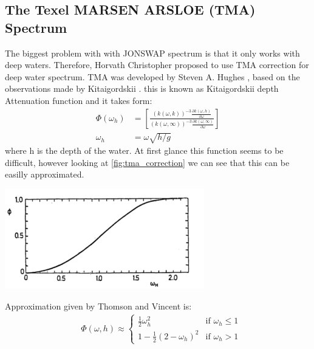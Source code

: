 \subsection{The Texel MARSEN ARSLOE (TMA) Spectrum}
The biggest problem with with JONSWAP spectrum is that it only works with deep waters. Therefore, Horvath Christopher \cite{horvath2015} proposed to use TMA correction for deep water spectrum.
TMA was developed by Steven A. Hughes \cite{hughes1984}, based on the observations made by Kitaigordskii \cite{kitaigordskii1975}.
this is known as Kitaigordskii depth Attenuation function and it takes form:
\begin{equation}
    \begin{aligned}
        \Phi(\omega_h) &= \left[ \frac{(k(\omega, k))^{-3}\frac{\partial k(\omega, h)}{\partial \omega}}{(k(\omega, \infty ))^{-3}\frac{\partial k(\omega, \infty)}{\partial \omega}} \right] \\
        \omega_h &= \omega \sqrt{h/g}
    \end{aligned}
\end{equation}
where h is the depth of the water. At first glance this function seems to be difficult, however looking at \ref{fig:tma_correction} we can see that this can be easilly approximated.

\begin{minipage}{1\textwidth}
    \centering
    \includegraphics[width=0.65\textwidth]{"images/tma_correction.png"}
    \label{fig:tma_correction}
\end{minipage}

Approximation given by Thomson and Vincent \cite{thompson1983} is:
\begin{equation}
    \begin{aligned}
        &\Phi(\omega, h) \approx
        \begin{cases} 
        \frac{1}{2} \omega_h^{2} & \text{if } \omega_h \leq 1 \\
        1 - \frac{1}{2}(2 - \omega_h)^{2} & \text{if } \omega_h > 1
        \end{cases}
    \end{aligned}
\end{equation}

